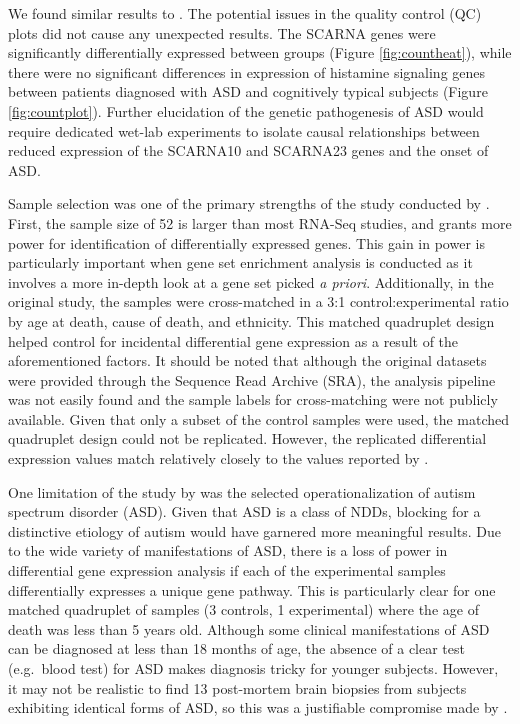 We found similar results to \citet{orig-paper}. The potential issues in
the quality control (QC) plots did not cause any unexpected results. The
SCARNA genes were significantly differentially expressed between groups
(Figure \ref{fig:countheat}), while there were no significant
differences in expression of histamine signaling genes between patients
diagnosed with ASD and cognitively typical subjects (Figure
\ref{fig:countplot}). Further elucidation of the genetic pathogenesis of
ASD would require dedicated wet-lab experiments to isolate causal
relationships between reduced expression of the SCARNA10 and SCARNA23
genes and the onset of ASD.

Sample selection was one of the primary strengths of the study conducted
by \citet{orig-paper}. First, the sample size of 52 is larger than most
RNA-Seq studies, and grants more power for identification of
differentially expressed genes. This gain in power is particularly
important when gene set enrichment analysis is conducted as it involves
a more in-depth look at a gene set picked \emph{a priori}. Additionally,
in the original study, the samples were cross-matched in a 3:1
control:experimental ratio by age at death, cause of death, and
ethnicity. This matched quadruplet design helped control for incidental
differential gene expression as a result of the aforementioned factors.
It should be noted that although the original datasets were provided
through the Sequence Read Archive (SRA), the analysis pipeline was not
easily found and the sample labels for cross-matching were not publicly
available. Given that only a subset of the control samples were used,
the matched quadruplet design could not be replicated. However, the
replicated differential expression values match relatively closely to
the values reported by \citet{orig-paper}.

One limitation of the study by \citet{orig-paper} was the selected
operationalization of autism spectrum disorder (ASD). Given that ASD is
a class of NDDs, blocking for a distinctive etiology of autism would
have garnered more meaningful results. Due to the wide variety of
manifestations of ASD, there is a loss of power in differential gene
expression analysis if each of the experimental samples differentially
expresses a unique gene pathway. This is particularly clear for one
matched quadruplet of samples (3 controls, 1 experimental) where the age
of death was less than 5 years old. Although some clinical
manifestations of ASD can be diagnosed at less than 18 months of age,
the absence of a clear test (e.g.~blood test) for ASD makes diagnosis
tricky for younger subjects. However, it may not be realistic to find 13
post-mortem brain biopsies from subjects exhibiting identical forms of
ASD, so this was a justifiable compromise made by \citet{orig-paper}.


